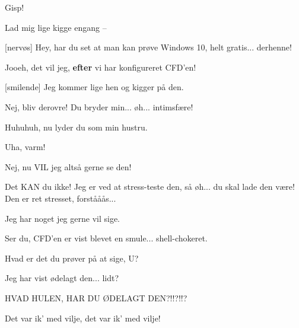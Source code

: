 \documentclass[a4paper,11pt]{article}
\begin{document}
\begin{sketch}
 Gisp!




 Lad mig lige kigge engang --

[nervøs] Hey, har du set at man kan prøve Windows 10, helt gratis...
derhenne! 

 Jooeh, det vil jeg, \textbf{efter} vi har konfigureret CFD'en!

[smilende] Jeg kommer lige hen og kigger på den.

 Nej, bliv derovre!  Du bryder min... øh... intimsfære!

 Huhuhuh, nu lyder du som min hustru.


 Uha, varm! 

 Nej, nu VIL jeg altså gerne se den!

 Det KAN du ikke!  Jeg er ved at stress-teste den, så øh... du
skal lade den være!  Den er ret stresset, forstååås...


 Jeg har noget jeg gerne vil sige.


 Ser du, CFD'en er vist blevet en smule... shell-chokeret.


 Hvad er det du prøver på at sige, U?

 Jeg har vist ødelagt den... lidt?


 HVAD HULEN, HAR DU ØDELAGT DEN?!!?!!?


 Det var ik' med vilje, det var ik' med vilje!


\end{sketch}
\end{document}
